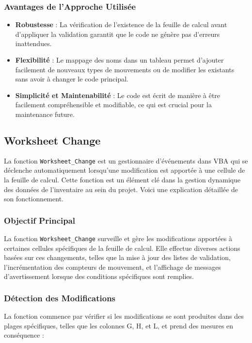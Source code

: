 \documentclass[a4paper, oneside, 12pt, final]{extreport}
\begin{document}
\subsubsection{Avantages de l'Approche Utilisée}
\begin{itemize}
    \item \textbf{Robustesse} : La vérification de l'existence de la feuille de calcul avant d'appliquer la validation garantit que le code ne génère pas d'erreurs inattendues.
    \item \textbf{Flexibilité} : Le mappage des noms dans un tableau permet d'ajouter facilement de nouveaux types de mouvements ou de modifier les existants sans avoir à changer le code principal.
    \item \textbf{Simplicité et Maintenabilité} : Le code est écrit de manière à être facilement compréhensible et modifiable, ce qui est crucial pour la maintenance future.
\end{itemize}


\subsection{Worksheet Change}
La fonction \texttt{Worksheet\_Change} est un gestionnaire d'événements dans VBA qui se déclenche automatiquement lorsqu'une modification est apportée à une cellule de la feuille de calcul. Cette fonction est un élément clé dans la gestion dynamique des données de l'inventaire au sein du projet. Voici une explication détaillée de son fonctionnement.

\subsubsection{Objectif Principal}
La fonction \texttt{Worksheet\_Change} surveille et gère les modifications apportées à certaines cellules spécifiques de la feuille de calcul. Elle effectue diverses actions basées sur ces changements, telles que la mise à jour des listes de validation, l'incrémentation des compteurs de mouvement, et l'affichage de messages d'avertissement lorsque des conditions spécifiques sont remplies.

\subsubsection{Détection des Modifications}
La fonction commence par vérifier si les modifications se sont produites dans des plages spécifiques, telles que les colonnes G, H, et L, et prend des mesures en conséquence :
\end{document}
